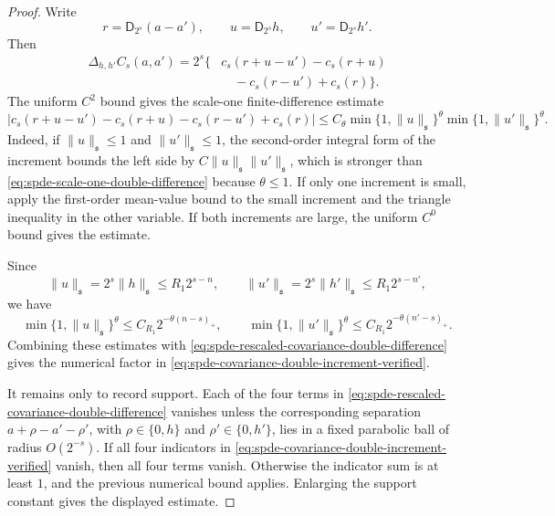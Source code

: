 \begin{proof}
Write
\[
  r=\mathsf D_{2^s}(a-a'),\qquad
  u=\mathsf D_{2^s}h,\qquad
  u'=\mathsf D_{2^s}h'.
\]
Then
\begin{equation}
\begin{aligned}
  \Delta_{h,h'}C_s(a,a')
  =
  2^s\{&
  c_s(r+u-u')-c_s(r+u)\\
  &\quad -c_s(r-u')+c_s(r)\}.
\end{aligned}
  \label{eq:spde-rescaled-covariance-double-difference}
\end{equation}
The uniform \(C^2\) bound gives the scale-one finite-difference estimate
\begin{equation}
  |c_s(r+u-u')-c_s(r+u)-c_s(r-u')+c_s(r)|
  \leq
  C_\theta
  \min\{1,\|u\|_{\mathfrak s}\}^{\theta}
  \min\{1,\|u'\|_{\mathfrak s}\}^{\theta}.
  \label{eq:spde-scale-one-double-difference}
\end{equation}
Indeed, if \(\|u\|_{\mathfrak s}\leq1\) and
\(\|u'\|_{\mathfrak s}\leq1\), the second-order integral form of the
increment bounds the left side by \(C\|u\|_{\mathfrak s}\|u'\|_{\mathfrak s}\),
which is stronger than \eqref{eq:spde-scale-one-double-difference} because
\(\theta\leq1\).  If only one increment is small, apply the first-order
mean-value bound to the small increment and the triangle inequality in the
other variable.  If both increments are large, the uniform \(C^0\) bound
gives the estimate.

Since
\[
  \|u\|_{\mathfrak s}=2^s\|h\|_{\mathfrak s}
  \leq R_1 2^{s-n},
  \qquad
  \|u'\|_{\mathfrak s}=2^s\|h'\|_{\mathfrak s}
  \leq R_1 2^{s-n'},
\]
we have
\[
  \min\{1,\|u\|_{\mathfrak s}\}^{\theta}
  \leq C_{R_1}2^{-\theta(n-s)_+},
  \qquad
  \min\{1,\|u'\|_{\mathfrak s}\}^{\theta}
  \leq C_{R_1}2^{-\theta(n'-s)_+}.
\]
Combining these estimates with
\eqref{eq:spde-rescaled-covariance-double-difference} gives the numerical
factor in \eqref{eq:spde-covariance-double-increment-verified}.

It remains only to record support.  Each of the four terms in
\eqref{eq:spde-rescaled-covariance-double-difference} vanishes unless the
corresponding separation \(a+\rho-a'-\rho'\), with
\(\rho\in\{0,h\}\) and \(\rho'\in\{0,h'\}\), lies in a fixed parabolic ball
of radius \(O(2^{-s})\).  If all four indicators in
\eqref{eq:spde-covariance-double-increment-verified} vanish, then all four
terms vanish.  Otherwise the indicator sum is at least \(1\), and the
previous numerical bound applies.  Enlarging the support constant gives the
displayed estimate.
\end{proof}

